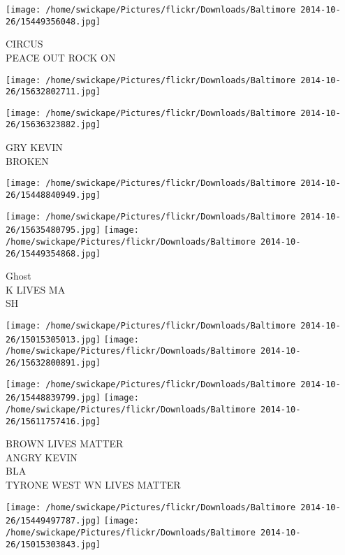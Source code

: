 \documentclass[10pt,letterpaper]{article}
\begin{document}
\vspace{0.25in}
\texttt{[image: /home/swickape/Pictures/flickr/Downloads/Baltimore 2014-10-26/15449356048.jpg]}

CIRCUS\\
PEACE OUT ROCK ON\\
\pagebreak

\texttt{[image: /home/swickape/Pictures/flickr/Downloads/Baltimore 2014-10-26/15632802711.jpg]}

\vspace{0.25in}
\texttt{[image: /home/swickape/Pictures/flickr/Downloads/Baltimore 2014-10-26/15636323882.jpg]}

GRY KEVIN\\
BROKEN\\
\pagebreak

\texttt{[image: /home/swickape/Pictures/flickr/Downloads/Baltimore 2014-10-26/15448840949.jpg]}

\vspace{0.25in}
\texttt{[image: /home/swickape/Pictures/flickr/Downloads/Baltimore 2014-10-26/15635480795.jpg]}
\texttt{[image: /home/swickape/Pictures/flickr/Downloads/Baltimore 2014-10-26/15449354868.jpg]}

Ghost\\
K LIVES MA\\
SH\\
\pagebreak

\texttt{[image: /home/swickape/Pictures/flickr/Downloads/Baltimore 2014-10-26/15015305013.jpg]}
\texttt{[image: /home/swickape/Pictures/flickr/Downloads/Baltimore 2014-10-26/15632800891.jpg]}

\texttt{[image: /home/swickape/Pictures/flickr/Downloads/Baltimore 2014-10-26/15448839799.jpg]}
\texttt{[image: /home/swickape/Pictures/flickr/Downloads/Baltimore 2014-10-26/15611757416.jpg]}

BROWN LIVES MATTER\\
ANGRY KEVIN\\
BLA\\
TYRONE WEST WN LIVES MATTER\\
\pagebreak

\texttt{[image: /home/swickape/Pictures/flickr/Downloads/Baltimore 2014-10-26/15449497787.jpg]}
\texttt{[image: /home/swickape/Pictures/flickr/Downloads/Baltimore 2014-10-26/15015303843.jpg]}
\end{document}
